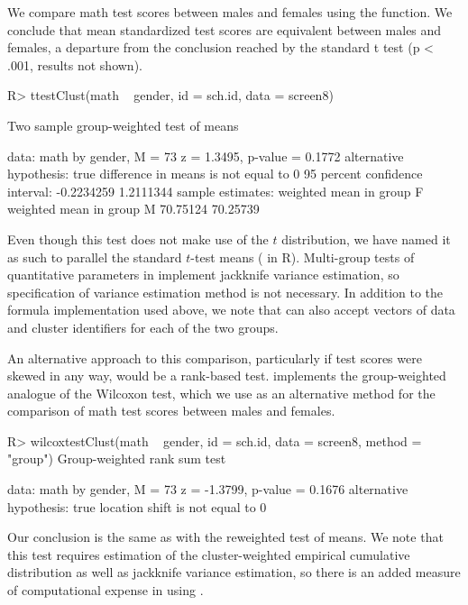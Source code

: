 We compare math test scores between males and females using the  function. We conclude that mean standardized test scores are equivalent between males and females, a departure from the conclusion reached by the standard t test (p < .001, results not shown). 
\begin{example}	
	R> ttestClust(math ~ gender, id = sch.id, data = screen8)
	
	Two sample group-weighted test of means
	
	data:  math by gender, M = 73
	z = 1.3495, p-value = 0.1772
	alternative hypothesis: true difference in means is not equal to 0
	95 percent confidence interval:
	-0.2234259  1.2111344
	sample estimates:
	weighted mean in group F weighted mean in group M 
	70.75124                 70.25739
\end{example}
Even though this test does not make use of the $t$ distribution, we have named it as such to parallel the standard $t$-test means ( in R). Multi-group tests of quantitative parameters in  implement jackknife variance estimation, so specification of variance estimation method is not necessary. In addition to the formula implementation used above, we note that  can also accept vectors of data and cluster identifiers for each of the two groups. 

An alternative approach to this comparison, particularly if test scores were skewed in any way, would be a rank-based test.  implements the group-weighted analogue of the Wilcoxon test, which we use as an alternative method for the comparison of math test scores between males and females.
\begin{example}	
	R> wilcoxtestClust(math ~ gender, id = sch.id, data = screen8, method = "group")
	Group-weighted rank sum test
	
	data:  math by gender, M = 73
	z = -1.3799, p-value = 0.1676
	alternative hypothesis: true location shift is not equal to 0
\end{example}
Our conclusion is the same as with the reweighted test of means. We note that this test requires estimation of the cluster-weighted empirical cumulative distribution \citep{dutta16} as well as jackknife variance estimation, so there is an added measure of computational expense in using .

